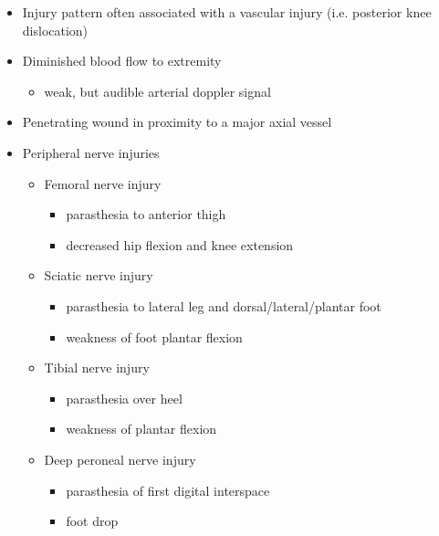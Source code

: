 \documentclass[
]{book}
\providecommand{\tightlist}{%
  \setlength{\itemsep}{0pt}\setlength{\parskip}{0pt}}
\begin{document}
\begin{itemize}
\item
  Injury pattern often associated with a vascular injury (i.e.
  posterior knee dislocation)
\item
  Diminished blood flow to extremity

  \begin{itemize}
  \tightlist
  \item
    weak, but audible arterial doppler signal
  \end{itemize}
\item
  Penetrating wound in proximity to a major axial vessel
\item
  Peripheral nerve injuries

  \begin{itemize}
  \tightlist
  \item
    Femoral nerve injury

    \begin{itemize}
    \tightlist
    \item
      parasthesia to anterior thigh
    \item
      decreased hip flexion and knee extension
    \end{itemize}
  \item
    Sciatic nerve injury

    \begin{itemize}
    \tightlist
    \item
      parasthesia to lateral leg and dorsal/lateral/plantar foot
    \item
      weakness of foot plantar flexion
    \end{itemize}
  \item
    Tibial nerve injury

    \begin{itemize}
    \tightlist
    \item
      parasthesia over heel
    \item
      weakness of plantar flexion
    \end{itemize}
  \item
    Deep peroneal nerve injury

    \begin{itemize}
    \tightlist
    \item
      parasthesia of first digital interspace
    \item
      foot drop\citep{bulger2014}
    \end{itemize}
  \end{itemize}
\end{itemize}
\end{document}
